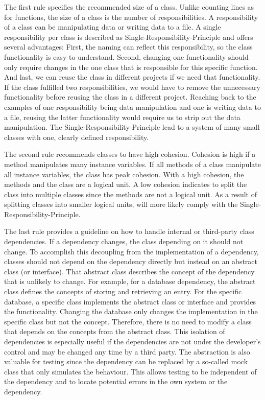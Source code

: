 The first rule specifies the recommended size of a class. Unlike counting lines as for functions, the size of a class is the number of responsibilities. A responsibility of a class can be manipulating data or writing data to a file. A single responsibility per class is described as Single-Responsibility-Principle and offers several advantages: First, the naming can reflect this responsibility, so the class functionality is easy to understand.
Second, changing one functionality should only require changes in the one class that is responsible for this specific function. And last, we can reuse the class in different projects if we need that functionality. If the class fulfilled two responsibilities, we would have to remove the unnecessary functionality before reusing the class in a different project. Reaching back to the examples of one responsibility being data manipulation and one is writing data to a file, reusing the latter functionality would require us to strip out the data manipulation.
The Single-Responsibility-Principle lead to a system of many small classes with one, clearly defined responsibility.

The second rule recommends classes to have high cohesion. Cohesion is high if a method manipulates many instance variables. If all methods of a class manipulate all instance variables, the class has peak cohesion. With a high cohesion, the methods and the class are a logical unit. A low cohesion indicates to split the class into multiple classes since the methods are not a logical unit. As a result of splitting classes into smaller logical units, will more likely comply with the Single-Responsibility-Principle.

The last rule provides a guideline on how to handle internal or third-party class dependencies. If a dependency changes, the class depending on it should not change. To accomplish this decoupling from the implementation of a dependency, classes should not depend on the dependency directly but instead on an abstract class (or interface). That abstract class describes the concept of the dependency that is unlikely to change. For example, for a database dependency, the abstract class defines the concepts of storing and retrieving an entry. For the specific database, a specific class implements the abstract class or interface and provides the functionality. Changing the database only changes the implementation in the specific class but not the concept. Therefore, there is no need to modify a class that depends on the concepts from the abstract class. This isolation of dependencies is especially useful if the dependencies are not under the developer's control and may be changed any time by a third party. The abstraction is also valuable for testing since the dependency can be replaced by a so-called mock class that only simulates the behaviour. This allows testing to be independent of the dependency and to locate potential errors in the own system or the dependency.

